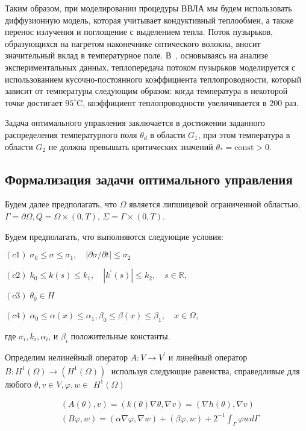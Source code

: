 Таким образом, при моделировании процедуры ВВЛА мы будем использовать
диффузионную модель, которая учитывает кондуктивный теплообмен,
а также перенос излучения и поглощение с выделением тепла.
Поток пузырьков, образующихся на нагретом наконечнике оптического волокна,
вносит значительный вклад в температурное поле.
В~\cite{Opticalthermal_vanRuijven2014, Some_Poluektova2014, Endovenous_Malskat2014},
основываясь на анализе экспериментальных данных,
теплопередача потоком пузырьков моделируется с использованием кусочно-постоянного
коэффициента теплопроводности, который зависит от температуры следующим образом:
когда температура в некоторой точке достигает $95 ^ {\circ} \mathrm{C}$,
коэффициент теплопроводности увеличивается в $200$ раз.

Задача оптимального управления заключается в достижении заданного распределения
температурного поля $\theta_{d}$ в области $G_{1}$, при этом температура в области
$G_{2}$ не должна превышать критических значений $\theta_{*}=\text{const}>0$.

\subsection{Формализация задачи оптимального управления}
\label{subsec:ch3:sec2:subsec2}

Будем далее предполагать, что $\Omega$ является липшицевой ограниченной областью,
$\Gamma=\partial \Omega, Q=\Omega \times(0, T)$, $\Sigma=\Gamma \times(0, T)$.

Будем предполагать, что выполняются следующие условия:

$(c1)\; \sigma_{0} \leq \sigma \leq \sigma_{1},
\quad|\partial \sigma / \partial t| \leq \sigma_{2}$

$(c2)\; k_{0} \leq k(s) \leq k_{1}, \quad\left|k^{\prime}(s)\right| \leq k_{2},
\quad s \in \mathbb{R}$,

$(c3)\; \theta_{0} \in H$

$(c4)\; \alpha_{0} \leq \alpha(x) \leq \alpha_{1},
\beta_{0} \leq \beta(x) \leq \beta_{1}, \quad x \in \Omega$,

где $\sigma_{i}, k_{i}, \alpha_{i}$, и $\beta_{i}$ положительные константы.

Определим нелинейный оператор $A: V \rightarrow V^{\prime}$ и линейный оператор
$B: H^{1}(\Omega) \rightarrow\left(H^{1}(\Omega)\right)^{\prime}$
используя следующие равенства, справедливые для любого
$\theta, v \in V, \varphi, w \in$ $H^{1}(\Omega)$

\[
    \begin{aligned}
        &(A(\theta), v)=(k(\theta) \nabla \theta, \nabla v)=(\nabla h(\theta), \nabla v) \\
        &(B \varphi, w)=(\alpha \nabla \varphi, \nabla w)+(\beta \varphi, w)+2^{-1}
        \int_{\Gamma} \varphi w d \Gamma
    \end{aligned}
\]


